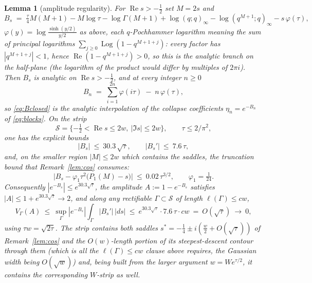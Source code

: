 \documentclass[11pt]{article}
\theoremstyle{plain}
\newtheorem{lemma}[theorem]{Lemma}
\theoremstyle{definition}
\theoremstyle{remark}
\renewcommand{\Re}{\operatorname{Re}}
\begin{document}
\begin{lemma}[amplitude regularity]\label{lem:Bbounded}
For $\Re s>-\tfrac12$ set $M=2s$ and
\begin{equation}\label{eq:Bclosed}
   B_s\;=\;\tfrac{\tau}4M(M{+}1)-M\log\tau-\log\Gamma(M{+}1)
   +\log(q;q)_\infty-\log(q^{M+1};q)_\infty-s\,\varphi(\tau),
\end{equation}
$\varphi(y)=\log\frac{\sinh(y/2)}{y/2}$ as above, each $q$-Pochhammer logarithm meaning the sum of
principal logarithms $\sum_{j\ge0}\operatorname{Log}(1-q^{M+1+j})$: every factor has
$|q^{M+1+j}|<1$, hence $\Re(1-q^{M+1+j})>0$, so this is the analytic branch on the half-plane
(the logarithm of the \emph{product} would differ by multiples of $2\pi i$). Then $B_s$ is analytic on $\Re s>-\tfrac12$, and
at every integer $n\ge0$
\begin{equation}\label{eq:Bsum}
   B_n\;=\;\sum_{i=1}^{2n}\varphi(i\tau)\;-\;n\,\varphi(\tau),
\end{equation}
so \eqref{eq:Bclosed} is the analytic interpolation of the collapse coefficients
$\eta_n=e^{-B_n}$ of \eqref{eq:blocks}. On the strip
\[
   \mathcal S=\{-\tfrac12<\Re s\le2w,\ |\Im s|\le2w\},\qquad \tau\le2/\pi^2,
\]
one has the explicit bounds
\begin{equation}\label{eq:Bbounds}
   |B_s|\ \le\ 30.3\,\sqrt\tau,\qquad |B_s'|\ \le\ 7.6\,\tau ,
\end{equation}
and, on the smaller region $|M|\le2w$ which contains the saddles, the truncation bound that
Remark~\ref{lem:cos} consumes:
\begin{equation}\label{eq:Btrunc}
   \bigl|B_s-\varphi_1\tau^2\bigl(P_1(M)-s\bigr)\bigr|\ \le\ 0.02\,\tau^{3/2},
   \qquad \varphi_1=\tfrac1{24}.
\end{equation}
Consequently $|e^{-B_s}|\le e^{30.3\sqrt\tau}$, the amplitude $A:=1-e^{-B_s}$ satisfies
$|A|\le1+e^{30.3\sqrt\tau}\to2$, and along any rectifiable $\Gamma\subset\mathcal S$ of length
$\ell(\Gamma)\le cw$,
\[
   V_\Gamma(A)\ \le\ \sup_\Gamma|e^{-B_s}|\int_\Gamma|B_s'|\,|ds|
   \ \le\ e^{30.3\sqrt\tau}\cdot7.6\,\tau\cdot cw\ =\ O(\sqrt\tau)\ \longrightarrow\ 0 ,
\]
using $\tau w=\sqrt{2\tau}$. The strip contains both saddles
$s^\ast=-\tfrac14\pm i(\tfrac w2+O(\sqrt\tau))$ of Remark~\ref{lem:cos} and the $O(w)$-length
portion of its steepest-descent contour through them (which is all the $\ell(\Gamma)\le cw$
clause above requires, the Gaussian width being $O(\sqrt w)$) and, being built from the larger
argument $w=We^{\tau/2}$, it contains the corresponding $W$-strip as well.
\end{lemma}
\end{document}
